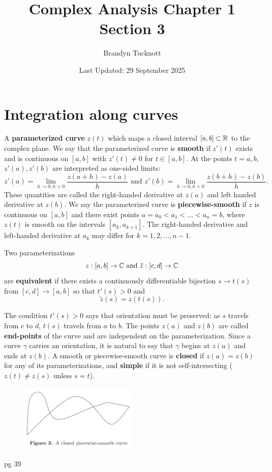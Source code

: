 \documentclass{exam}
\title{Complex Analysis Chapter 1 Section 3}
\author{Brandyn Tucknott}
\date{Last Updated: 29 September 2025}
\begin{document}
\maketitle

\section{Integration along curves}
A \textbf{parameterized curve} $z(t)$ which maps a closed interval $[a, b] \subset \mathbb {R}$ to the complex plane. We say that the parameterized
curve is \textbf{smooth} if $z'(t)$ exists and is continuous on $[a, b]$ with $z'(t) \neq 0$ for $t\in [a ,b]$. At the points $t = a, b$,
$z'(a), z'(b)$ are interpreted as one-sided limits:
$$z'(a) = \lim_{h\to 0, h > 0} \frac{z(a + h) - z(a)}{h} \text{ and } z'(b) = \lim_{h\to 0, h < 0} \frac{z(b + h) - z(b)}{h}.$$
These quantities are called the right-handed derivative at $z(a)$ and left handed derivative at $z(b)$. We say the parameterized curve is
\textbf{piecewise-smooth} if $z$ is continuous on $[a, b]$ and there exist points $a = a_0 < a_1 < \hdots < a_n = b$,
where $z(t)$ is smooth on the intervals $[a_k, a_{k + 1}]$. The right-handed derivative and left-handed derivative at $a_k$ may differ for 
$k = 1, 2, \hdots, n - 1$.

Two parameterizations
$$z: [a, b]\to\mathbb{C} \text{ and } \tilde{z}: [c, d]\to \mathbb{C}$$
are \textbf{equivalent} if there exists a continuously differentiable bijection $s\to t(s)$ from $[c, d]\to[a, b]$ so that $t'(s) > 0$ and
$$\tilde{z}(s) = z(t(s)).$$

The condition $t'(s) > 0$ says that orientation must be preserved: as $s$ travels from $c$ to $d$, $t(s)$ travels from $a$ to $b$. The points
$z(a)$ and $z(b)$ are called \textbf{end-points} of the curve and are independent on the parameterization. Since a curve $\gamma$ carries an
orientation, it is natural to say that $\gamma$ begins at $z(a)$ and ends at $z(b)$. A smooth or piecewise-smooth curve is \textbf{closed}
if $z(a) = z(b)$ for any of its parameterizations, and \textbf{simple} if it is not self-intersecting ($z(t) \neq z(s)$ unless $s = t$).

\begin{figure}[H]
    \centering
    \includegraphics[width=0.5\textwidth]{figures/complex_analysis/figure_3.png}
\end{figure}

pg 39
\end{document}
